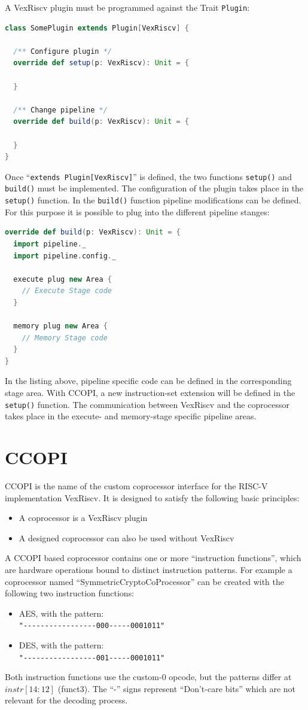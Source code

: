 \documentclass[twoside,twocolumn]{article}
\newcommand{\code}[1]{\texttt{#1}}
\begin{document}
A VexRiscv plugin must be programmed against the Trait \code{Plugin}:
\begin{lstlisting}[language=scala]
class SomePlugin extends Plugin[VexRiscv] {

  /** Configure plugin */
  override def setup(p: VexRiscv): Unit = {
  
  }
  
  /** Change pipeline */
  override def build(p: VexRiscv): Unit = {
  
  }
}
\end{lstlisting}
\noindent Once ``\code{extends Plugin[VexRiscv]}'' is defined, the two
functions \code{setup()} and \code{build()} must be implemented. The
configuration of the plugin takes place in the \code{setup()} function.
In the \code{build()} function pipeline modifications can be defined.
For this purpose it is possible to plug into the different pipeline
stanges:
\begin{lstlisting}[language=scala]
override def build(p: VexRiscv): Unit = {
  import pipeline._
  import pipeline.config._

  execute plug new Area {
    // Execute Stage code
  }

  memory plug new Area {
    // Memory Stage code
  }
}
\end{lstlisting}
In the listing above, pipeline specific code can be defined in the
corresponding stage area. With CCOPI, a new instruction-set extension
will be defined in the \code{setup()} function. The communication
between VexRiscv and the coprocessor takes place in the execute- and
memory-stage specific pipeline areas.

\section{CCOPI}
CCOPI is the name of the custom coprocessor interface for the RISC-V
implementation VexRiscv. It is designed to satisfy the following basic
principles:
\begin{itemize}
    \item A coprocessor is a VexRiscv plugin
    \item A designed coprocessor can also be used without VexRiscv
\end{itemize}
A CCOPI based coprocessor contains one or more ``instruction
functions'', which are hardware operations bound to distinct
instruction patterns. For example a coprocessor named
``SymmetricCryptoCoProcessor'' can be created with the following two
instruction functions:
\begin{itemize}
    \item AES, with the pattern:\\ \code{"-{}-{}-{}-{}-{}-{}-{}-{}-{}-{}-{}-{}-{}-{}-{}-{}-{}000-{}-{}-{}-{}-{}0001011"} 
    \item DES, with the pattern: \\ \code{"-{}-{}-{}-{}-{}-{}-{}-{}-{}-{}-{}-{}-{}-{}-{}-{}-{}001-{}-{}-{}-{}-{}0001011"}
\end{itemize}
Both instruction functions use the custom-0 opcode, but the patterns
differ at $instr[14:12]$ (funct3). The ``-'' signs represent ``Don't-care
bits'' which are not relevant for the decoding process.
\end{document}
